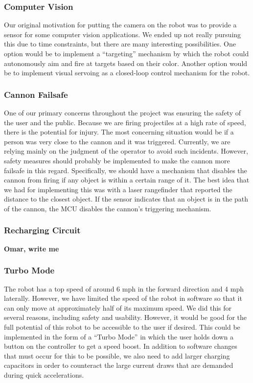 \documentclass[letterpaper,12pt]{article}
\newcommand{\xxx}[1]{{\color{red}\bf #1}}
\begin{document}
\subsubsection{Computer Vision}
Our original motivation for putting the camera on the robot was to provide a
sensor for some computer vision applications. We ended up not really pursuing
this due to time constraints, but there are many interesting possibilities. One
option would be to implement a ``targeting'' mechanism by which the robot could
autonomously aim and fire at targets based on their color. Another option would
be to implement visual servoing as a closed-loop control mechanism for the
robot.

\subsubsection{Cannon Failsafe}
One of our primary concerns throughout the project was ensuring the safety of
the user and the public. Because we are firing projectiles at a high rate of
speed, there is the potential for injury. The most concerning situation would be
if a person was very close to the cannon and it was triggered. Currently, we are
relying mainly on the judgment of the operator to avoid such incidents. However,
safety measures should probably be implemented to make the cannon more failsafe
in this regard. Specifically, we should have a mechanism that disables the
cannon from firing if any object is within a certain range of it. The best idea
that we had for implementing this was with a laser rangefinder that reported the
distance to the closest object. If the sensor indicates that an object is in the
path of the cannon, the MCU disables the cannon's triggering mechanism.

\subsubsection{Recharging Circuit}
\xxx{Omar, write me}

\subsubsection{Turbo Mode}
The robot has a top speed of around 6 mph in the forward direction and 4 mph
laterally. However, we have limited the speed of the robot in software so that
it can only move at approximately half of its maximum speed. We did this for
several reasons, including safety and usability. However, it would be good for
the full potential of this robot to be accessible to the user if desired. This
could be implemented in the form of a ``Turbo Mode'' in which the user holds
down a button on the controller to get a speed boost. In addition to software
changes that must occur for this to be possible, we also need to add larger
charging capacitors in order to counteract the large current draws that are
demanded during quick accelerations.
\end{document}
